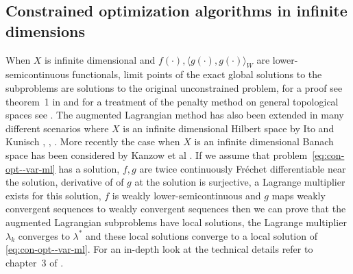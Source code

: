 \subsection{Constrained optimization algorithms in infinite dimensions} When $X$ is infinite dimensional and $f(\cdot),\langle g(\cdot), g(\cdot)\rangle_W$ are lower-semicontinuous functionals, limit points of the exact global solutions to the subproblems are solutions to the original unconstrained problem, for a proof see theorem~1 in \cite{dussault2007penalty} and for a treatment of the penalty method on general topological spaces see \cite{fiacco1969generalized}. The augmented Lagrangian method has also been extended in many different scenarios where $X$ is an infinite dimensional Hilbert space by Ito and Kunisch \cite{ito1990augmented}, \cite{ito1990augmentedvar}, \cite{ito2008lagrange}. More recently the case when $X$ is an infinite dimensional Banach space has been considered by Kanzow et al \cite{kanzow2018augmented}. If we assume that problem~\eqref{eq:con-opt--var-ml} has a solution, $f, g$ are twice continuously Fréchet differentiable near the solution, derivative of of $g$ at the solution is surjective, a Lagrange multiplier exists for this solution, $f$ is weakly lower-semicontinuous and $g$ maps weakly convergent sequences to weakly convergent sequences then we can prove that the augmented Lagrangian subproblems have local solutions, the Lagrange multiplier $\lambda_k$ converges to $\lambda^*$ and these local solutions converge to a local solution of \eqref{eq:con-opt--var-ml}. For an in-depth look at the technical details refer to chapter~3 of \cite{ito2008lagrange}. 

